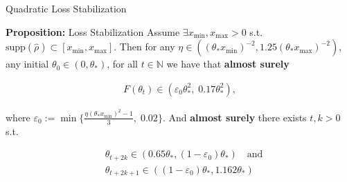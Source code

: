 \documentclass[fleqn]{beamer}
\begin{document}
    \begin{frame}{Quadratic Loss Stabilization}
        \begin{block}{\textbf{Proposition:} Loss Stabilization}
            Assume $\exists x_{\text{min}}, x_{\text{max}} > 0$ s.t.
            $\text{supp}(\hat{\rho}) \subset [x_\text{min}, x_\text{max}]$.
            Then for any $\eta \in \left( (\theta_* x_\text{min})^{-2}, 1.25
            (\theta_*x_\text{max})^{-2}\right)$, any initial $\theta_{0} \in
            (0, \theta_*)$, for all $t \in \mathbb{N}$ we have that
            \textbf{almost surely}
            \begin{center}
            \begin{minipage}{0.5\textwidth}
            \begin{align*}
                F(\theta_t) \in \left(\varepsilon_0 \theta_*^{2},\; 0.17
                \theta_*^{2}\right),
            \end{align*}
            \end{minipage}
            \end{center}
        where $\varepsilon_0 := \min
        \{\frac{\eta(\theta_*x_\text{min})^{2}-1}{3},\; 0.02\}$.
        \newline
        And \textbf{almost surely} there exists $t, k >0$ s.t.
        \begin{center}
        \begin{minipage}{0.5\textwidth}
        \begin{align*}
            &\theta_{t+2k} \in (0.65\theta_*, (1-\varepsilon_0)\theta_*) \quad
            \text{and}\\
            &\theta_{t+2k+1} \in ((1-\varepsilon_0)\theta_*, 1.162\theta_*)
        \end{align*}
        \end{minipage}
        \end{center}
        \end{block}
    \end{frame}
\end{document}
